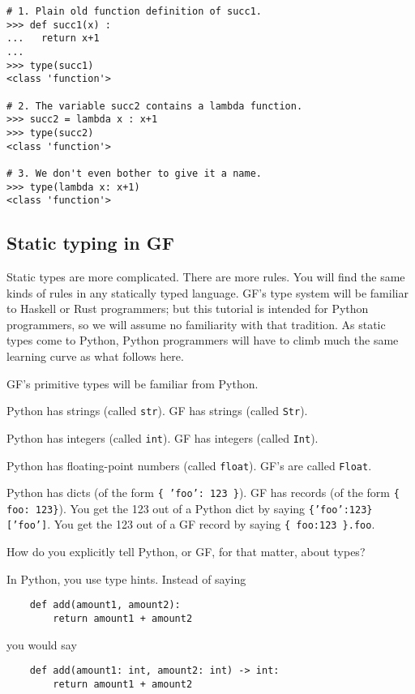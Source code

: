 \documentclass{scrartcl}
\begin{document}
\begin{verbatim}
# 1. Plain old function definition of succ1.
>>> def succ1(x) :
...   return x+1
... 
>>> type(succ1)
<class 'function'>

# 2. The variable succ2 contains a lambda function.
>>> succ2 = lambda x : x+1
>>> type(succ2)
<class 'function'>

# 3. We don't even bother to give it a name.
>>> type(lambda x: x+1)
<class 'function'>
\end{verbatim}

\subsection{Static typing in GF}

Static types are more complicated. There are more rules. You will find the same kinds of rules in any statically typed language. GF's type system will be familiar to Haskell or Rust programmers; but this tutorial is intended for Python programmers, so we will assume no familiarity with that tradition. As static types come to Python, Python programmers will have to climb much the same learning curve as what follows here.

GF's primitive types will be familiar from Python.

Python has strings (called \texttt{str}). GF has strings (called \texttt{Str}).

Python has integers (called \texttt{int}). GF has integers (called \texttt{Int}).

Python has floating-point numbers (called \texttt{float}). GF's are called \texttt{Float}.

Python has dicts (of the form \texttt{\{ 'foo': 123 \}}). GF has records (of the form \texttt{\{ foo: 123\}}). You get the 123 out of a Python dict by saying \texttt{\{'foo':123\}['foo']}. You get the 123 out of a GF record by saying \texttt{\{ foo:123 \}.foo}.


How do you explicitly tell Python, or GF, for that matter, about types?

In Python, you use type hints. Instead of saying

\begin{verbatim}
    def add(amount1, amount2):
        return amount1 + amount2
\end{verbatim}

you would say

\begin{verbatim}
    def add(amount1: int, amount2: int) -> int:
        return amount1 + amount2
\end{verbatim}
\end{document}
